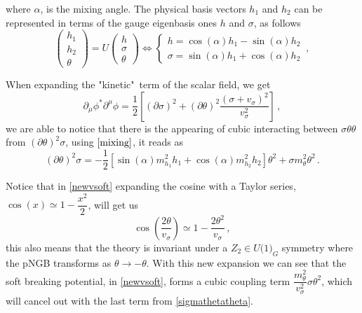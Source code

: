where $\alpha$, is the mixing angle.
The physical basis vectors $h_1$ and $h_2$ can be represented in terms of the gauge eigenbasis ones $h$ and $\sigma$, as follows
\begin{equation}
\label{mixing}
	\left(\begin{array}{l}
		h_1 \\
		h_2 \\
		\theta 
	\end{array}\right)=U\left(\begin{array}{l}
	h \\
	\sigma \\
	\theta 
\end{array}\right)\Leftrightarrow \left\{\begin{array}{cc}
     h=\cos(\alpha)h_1-\sin(\alpha)h_2 \\
     \sigma=\sin(\alpha)h_1+\cos(\alpha)h_2 
\end{array}\right.\,,
\end{equation}

When expanding the "kinetic"\ term of the scalar field, we get
\begin{equation}
    \partial_\mu\phi^*\partial^\mu\phi=\dfrac{1}{2}\left[(\partial\sigma)^2+(\partial\theta)^2\dfrac{(\sigma+v_\sigma)^2}{v_\sigma^2}\right]\,,
\end{equation}
we are able to notice that there is the appearing of cubic interacting between $\sigma\theta\theta$ from $(\partial\theta)^2\sigma$, using $\autoref{mixing}$, it reads as
\begin{equation}
\label{sigmathetatheta}
    (\partial\theta)^2\sigma=-\dfrac{1}{2}\left[\sin(\alpha)m_{h_1}^2h_1+\cos(\alpha)m_{h_2}^2h_2\right]\theta^2+\sigma m_\theta^2\theta^2\,.
\end{equation}

Notice that in \autoref{newvsoft} expanding the cosine with a Taylor series, $\cos(x)\simeq 1-\dfrac{x^2}{2}$, will get us
\begin{equation}
\label{taylorcosine}
	\cos\left(\dfrac{2\theta}{v_\sigma}\right)\simeq 1 - \dfrac{2\theta^2}{v_\sigma}\,,
\end{equation}
this also means that the theory is invariant under a $Z_2 \in U\textrm{(1)}_G$ symmetry where the pNGB transforms as $\theta \rightarrow -\theta$.
With this new expansion we can see that the soft breaking potential, in \autoref{newvsoft}, forms a cubic coupling term $\dfrac{m_\theta^2}{v_\sigma^2}\sigma\theta^2$, which will cancel out with the last term from \autoref{sigmathetatheta}.

